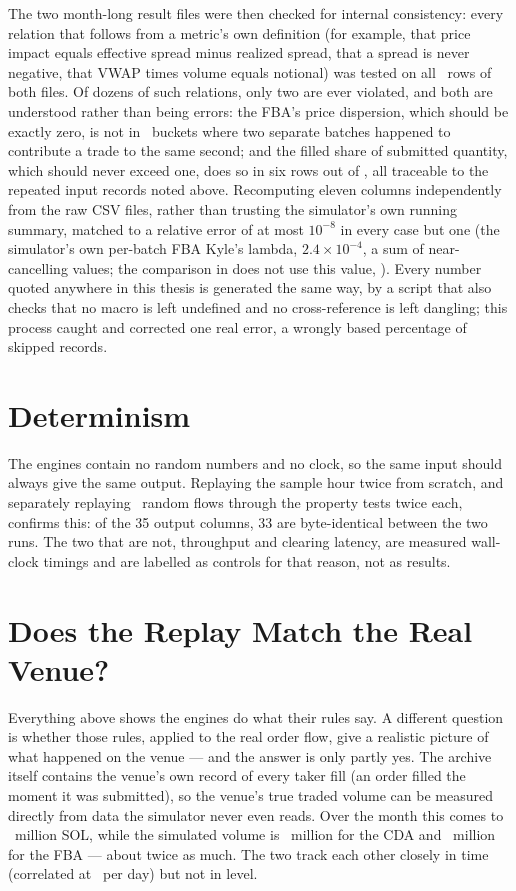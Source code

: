 The two month-long result files were then checked for internal consistency: every
relation that follows from a metric's own definition (for example, that price
impact equals effective spread minus realized spread, that a spread is never
negative, that VWAP times volume equals notional) was tested on all \VerRows\ rows
of both files. Of dozens of such relations, only two are ever violated, and both are
understood rather than being errors: the FBA's price dispersion, which should be
exactly zero, is not in \VerDispRows\ buckets where two separate batches happened to
contribute a trade to the same second; and the filled share of submitted quantity,
which should never exceed one, does so in six rows out of \VerFillRows, all traceable
to the repeated input records noted above. Recomputing eleven columns independently from the raw CSV
files, rather than trusting the simulator's own running summary, matched to a
relative error of at most $10^{-8}$ in every case but one (the simulator's own
per-batch FBA Kyle's lambda, $2.4\times10^{-4}$, a sum of near-cancelling values;
the comparison in  does not use this value, ). Every number quoted anywhere in
this thesis is generated the same way, by a script that also checks that no macro is
left undefined and no cross-reference is left dangling; this process caught and
corrected one real error, a wrongly based percentage of skipped records.

\section{Determinism}
\label{sec:testdeterminism}

The engines contain no random numbers and no clock, so the same input should always
give the same output. Replaying the sample hour twice from scratch, and separately
replaying \VerDetReplays\ random flows through the property tests twice each,
confirms this: of the 35 output columns, 33 are byte-identical between the two runs.
The two that are not, throughput and clearing latency, are measured wall-clock
timings and are labelled as controls for that reason, not as results.

\section{Does the Replay Match the Real Venue?}
\label{sec:testfidelity}

Everything above shows the engines do what their rules say. A different question is
whether those rules, applied to the real order flow, give a realistic picture of
what happened on the venue --- and the answer is only partly yes. The
archive itself contains the venue's own record of every taker fill (an order filled
the moment it was submitted), so the venue's true traded volume can be measured
directly from data the simulator never even reads. Over the month this comes to
\VerVenueVol\ million SOL, while the simulated volume is \VerCdaVol\ million for the
CDA and \VerFbaVol\ million for the FBA --- about twice as much. The two track each
other closely in time (correlated at \VerCorrDay\ per day) but not in level.


